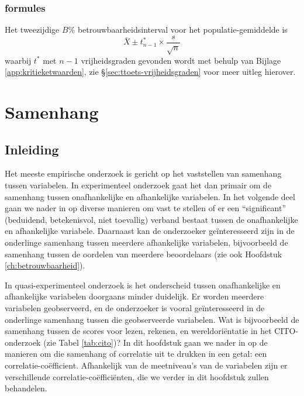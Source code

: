 \documentclass[
]{book}
\begin{document}
\hypertarget{formules-2}{%
\subsection{formules}\label{formules-2}}

Het tweezijdige \(B\)\% betrouwbaarheidsinterval voor het
populatie-gemiddelde is
\begin{equation}
  \bar{X} \pm t^*_{n-1} \times \frac{s}{\sqrt{n}}
  \label{eq:t-onesampleCI}
\end{equation}
waarbij \(t^*\) met \(n-1\) vrijheidsgraden gevonden wordt met behulp van
Bijlage \ref{app:kritieketwaarden}, zie
§\ref{sec:ttoets-vrijheidsgraden} voor meer uitleg hierover.

\hypertarget{ch:samenhang}{%
\chapter{Samenhang}\label{ch:samenhang}}

\hypertarget{inleiding-5}{%
\section{Inleiding}\label{inleiding-5}}

Het meeste empirische onderzoek is gericht op het vaststellen van
samenhang tussen variabelen. In experimenteel onderzoek gaat het dan
primair om de samenhang tussen onafhankelijke en afhankelijke
variabelen. In het volgende deel gaan we nader in op diverse manieren om
vast te stellen of er een ``significant'' (beduidend, betekenisvol, niet
toevallig) verband bestaat tussen de onafhankelijke en afhankelijke
variabele. Daarnaast kan de onderzoeker geïnteresseerd zijn in de
onderlinge samenhang tussen meerdere afhankelijke variabelen,
bijvoorbeeld de samenhang tussen de oordelen van meerdere beoordelaars
(zie ook Hoofdstuk \ref{ch:betrouwbaarheid}).

In quasi-experimenteel onderzoek is het onderscheid tussen
onafhankelijke en afhankelijke variabelen doorgaans minder duidelijk. Er
worden meerdere variabelen geobserveerd, en de onderzoeker is vooral
geïnteresseerd in de onderlinge samenhang tussen die geobserveerde
variabelen. Wat is bijvoorbeeld de samenhang tussen de scores voor
lezen, rekenen, en wereldoriëntatie in het CITO-onderzoek (zie
Tabel \ref{tab:cito})? In dit hoofdstuk gaan we nader in op de manieren
om die samenhang of correlatie uit te drukken in een getal: een
correlatie-coëfficient. Afhankelijk van de meetniveau's van de
variabelen zijn er verschillende correlatie-coëfficiënten, die we verder
in dit hoofdstuk zullen behandelen.
\end{document}
